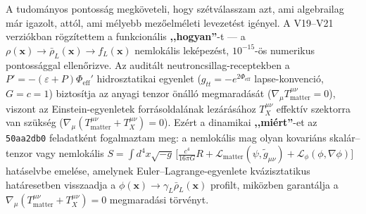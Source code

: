 \documentclass[10pt,a4paper]{article}
\begin{document}
\par
A tudom\'anyos pontoss\'ag megk\"oveteli, hogy sz\'etv\'alasszam azt, ami algebrailag m\'ar igazolt, att\'ol, ami m\'elyebb mez\H{o}elm\'eleti levezet\'est ig\'enyel. A V19--V21 verzi\'okban r\"ogz\'itettem a funkcion\'alis \textbf{,,hogyan''}-t --- a $\rho(\mathbf{x}) \to \bar{\rho}_L(\mathbf{x}) \to f_L(\mathbf{x})$ nemlok\'alis lek\'epez\'est, $10^{-15}$-\"os numerikus pontoss\'aggal ellen\H{o}rizve. Az audit\'alt neutroncsillag-receptekben a $P' = -(\varepsilon+P)\Phi_{\text{eff}}'$ hidrosztatikai egyenlet ($g_{tt} = -e^{2\Phi_{\text{eff}}}$ lapse-konvenció, $G=c=1$) biztos\'itja az anyagi tenzor \"on\'all\'o megmarad\'as\'at ($\nabla_\mu T^{\mu\nu}_{\text{matter}} = 0$), viszont az Einstein-egyenletek forr\'asoldal\'anak lez\'ar\'as\'ahoz $T^{\mu\nu}_X$ effekt\'iv szektorra van sz\"uks\'eg ($\nabla_\mu(T^{\mu\nu}_{\text{matter}} + T^{\mu\nu}_X) = 0$). Ez\'ert a dinamikai \textbf{,,mi\'ert''}-et az \texttt{50aa2db0} feladatk\'ent fogalmaztam meg: a nemlok\'alis mag olyan kovari\'ans skal\'ar--tenzor vagy nemlok\'alis $S = \int d^4x\sqrt{-g}\,\bigl[\frac{c^4}{16\pi G}R + \mathcal{L}_{\text{matter}}(\psi, \tilde{g}_{\mu\nu}) + \mathcal{L}_\phi(\phi,\nabla\phi)\bigr]$ hat\'aselvbe emel\'ese, amelynek Euler--Lagrange-egyenlete kv\'azisztatikus hat\'aresetben visszaadja a $\phi(\mathbf{x}) \to \gamma_L\bar{\rho}_L(\mathbf{x})$ profilt, mik\"ozben garant\'alja a $\nabla_\mu(T^{\mu\nu}_{\text{matter}} + T^{\mu\nu}_X) = 0$ megmarad\'asi t\"orv\'enyt.
\end{document}
